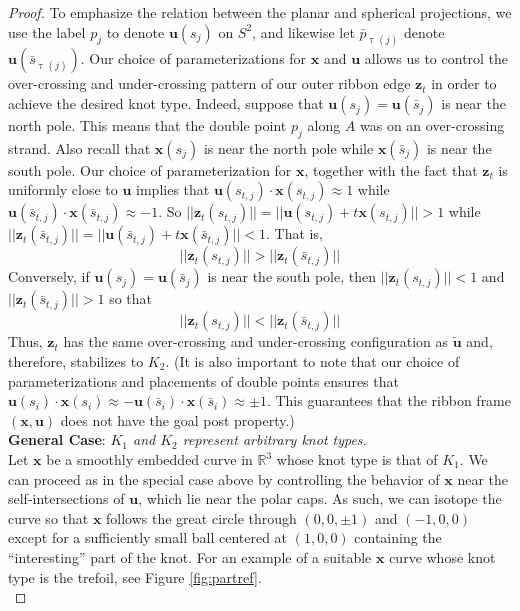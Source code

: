 \documentclass[12pt]{article}
\numberwithin{equation}{subsection}
\theoremstyle{definition}
\numberwithin{lem}{section}
\def\uu{\mathbf{u}}
\def\zz{\mathbf{z}}
\begin{document}
\begin{proof}
To emphasize the relation between the planar and spherical projections, we use the label $p_j$ to denote $\mathbf{u}(s_j)$ on $S^2$, and likewise let $\bar{p}_{\uptau(j)}$ denote $\mathbf{u}(\bar{s}_{\uptau(j)})$.  Our choice of parameterizations for $\mathbf{x}$ and $\mathbf{u}$ allows us to control the over-crossing and under-crossing pattern of our outer ribbon edge $\mathbf{z}_t$ in order to achieve the desired knot type.  Indeed, suppose that $\mathbf{u}(s_j) = \mathbf{u}(\bar{s}_j)$ is near the north pole.  This means that the double point $p_j$ along $A$ was on an over-crossing strand.  Also recall that $\mathbf{x}(s_j)$ is near the north pole while $\mathbf{x}(\bar{s}_j)$ is near the south pole.  Our choice of parameterization for $\mathbf{x}$, together with the fact that $\zz_t$ is uniformly close to $\uu$ implies that $\uu(s_{t,j}) \cdot \mathbf{x}(s_{t,j}) \approx 1$ while $\uu(\bar{s}_{t,j}) \cdot \mathbf{x}(\bar{s}_{t,j}) \approx -1$. So $||\mathbf{z}_t(s_{t,j})|| = ||\mathbf{u}(s_{t,j}) + t\mathbf{x}(s_{t,j})||  > 1$  while $ ||\mathbf{z}_t(\bar{s}_{t,j})|| = ||\mathbf{u}(\bar{s}_{t,j}) + t\mathbf{x}(\bar{s}_{t,j})||  < 1$.  That is,
$$||\mathbf{z}_t(s_{t,j})|| > ||\mathbf{z}_t(\bar{s}_{t,j})||$$
Conversely, if $\mathbf{u}(s_j) = \mathbf{u}(\bar{s}_j)$ is near the south pole, then $||\mathbf{z}_t(s_{t,j})|| < 1$ and $||\mathbf{z}_t(\bar{s}_{t,j})|| > 1$ so that
$$||\mathbf{z}_t(s_{t,j})|| < ||\mathbf{z}_t(\bar{s}_{t,j})||$$
Thus, $\mathbf{z}_t$ has the same over-crossing and under-crossing configuration as $\tilde{\mathbf{u}}$ and, therefore, stabilizes to $K_2$.  (It is also important to note that our choice of parameterizations and placements of double points ensures that $\mathbf{u}(s_i) \cdot \mathbf{x}(s_i) \approx - \mathbf{u}(\bar{s}_i) \cdot \mathbf{x}(\bar{s}_i) \approx \pm 1$.  This guarantees that the ribbon frame $(\mathbf{x}, \mathbf{u})$ does not have the goal post property.)\\


\noindent \textbf{General Case}: \emph{$K_1$ and $K_2$ represent arbitrary knot types.}\\

Let $\mathbf{x}$ be a smoothly embedded curve in $\mathbb{R}^3$ whose knot type is that of $K_1$.  We can proceed as in the special case above by controlling the behavior of $\mathbf{x}$ near the self-intersections of $\mathbf{u}$, which lie near the polar caps.  As such, we can isotope the curve so that $\mathbf{x}$ follows the great circle through $(0,0,\pm 1)$ and $(-1,0,0)$ except for a sufficiently small ball centered at $(1,0,0)$ containing the ``interesting'' part of the knot.  For an example of a suitable $\mathbf{x}$ curve whose knot type is the trefoil, see Figure \ref{fig:partref}.\\


\end{proof}
\end{document}

